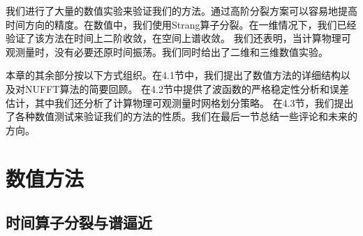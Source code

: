 
我们进行了大量的数值实验来验证我们的方法。通过高阶分裂方案可以容易地提高时间方向的精度。在数值中，我们使用Strang算子分裂。在一维情况下，我们已经验证了该方法在时间上二阶收敛，在空间上谱收敛。
我们还表明，当计算物理可观测量时，没有必要还原时间振荡。我们同时给出了二维和三维数值实验。


本章的其余部分按以下方式组织。在4.1节中，我们提出了数值方法的详细结构以及对NUFFT算法的简要回顾。 在4.2节中提供了波函数的严格稳定性分析和误差估计，其中我们还分析了计算物理可观测量时网格划分策略。
在4.3节，我们提出了各种数值测试来验证我们的方法的性质。我们在最后一节总结一些评论和未来的方向。







\section{数值方法}

\subsection{时间算子分裂与谱逼近}


